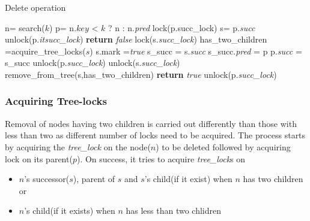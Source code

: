 \documentclass[MTech]{iitmdiss}
\begin{document}
\begin{algorithm}
\caption{Delete operation}
\label{alg:delete}
\begin{algorithmic}[1]
    \State n= search($k$)
    \State p= n.$key$ < $k$ ? n : n.\textit{pred}
    \State lock(p.succ\_lock)
    \State s= p.\textit{succ}
    \If{$k \in $(p.\textit{key}, s.\textit{key}] \&\& !p.mark}
            \State unlock(p.\textit{itsucc\_lock})
            \State \textbf{return} \textit{false}
        \EndIf
        \State lock(s.\textit{succ\_lock})
        \State has\_two\_children =acquire\_tree\_locks($s$)
        \State s.mark =\textit{true}
        \State s\_succ = s.\textit{succ}
        \State s\_succ.\textit{pred} = p
        \State p.\textit{succ} = s\_succ
        \State unlock(p.\textit{succ\_lock})
        \State unlock(s.\textit{succ\_lock})
        \State remove\_from\_tree(s,has\_two\_children)
        \State \textbf{return} \textit{true}
    \EndIf
    \State unlock(p.\textit{succ\_lock})
\EndWhile
\EndFunction
\end{algorithmic}
\end{algorithm}

\subsubsection{Acquiring Tree-locks}
Removal of nodes having two children is carried out differently than those with less than two as different number of locks need to be acquired. The process starts by acquiring the \textit{tree\_lock} on the node($n$) to be deleted followed by acquiring lock on its parent($p$). On success, it tries to acquire \textit{tree\_lock}s on
\begin{itemize}
\item $n$'s successor($s$), parent of $s$ and $s$'s child(if it exist) when $n$ has two children or
\item $n$'s child(if it exists) when $n$ has less than two chlidren
\end{itemize}
\end{document}
